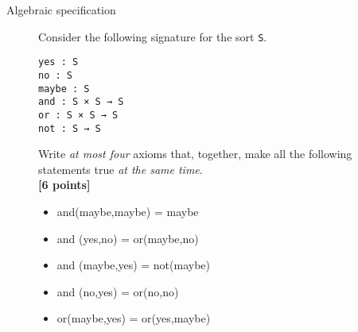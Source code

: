 \documentclass{article}
\begin{document}
\begin{description}
\item[Algebraic specification]

Consider the following signature for the sort \verb!S!.

\begin{verbatim}
yes : S
no : S
maybe : S
and : S × S → S
or : S × S → S
not : S → S
\end{verbatim}

Write \emph{at most four} axioms that, together, make all the
following statements true \emph{at the same time}. \\ \hfill{\textbf{[6 points]}}

\begin{itemize}
\item
  and(maybe,maybe) = maybe
\item
  and (yes,no) = or(maybe,no)
\item
  and (maybe,yes) = not(maybe)
\item
  and (no,yes) = or(no,no)
\item
  or(maybe,yes) = or(yes,maybe)
\end{itemize}
\end{description}


\newpage
\end{document}
